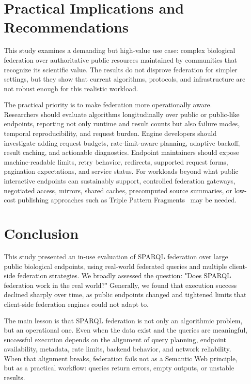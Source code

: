 \documentclass[runningheads]{llncs}
\begin{document}
\section{Practical Implications and Recommendations}\label{sec8}
This study examines a demanding but high-value use case: complex biological federation over authoritative public resources maintained by communities that recognize its scientific value. 
The results do not disprove federation for simpler settings, but they show that current algorithms, protocols, and infrastructure are not robust enough for this realistic workload.

The practical priority is to make federation more operationally aware. 
Researchers should evaluate algorithms longitudinally over public or public-like endpoints, reporting not only runtime and result counts but also failure modes, temporal reproducibility, and request burden. 
Engine developers should investigate adding request budgets, rate-limit-aware planning, adaptive backoff, result caching, and actionable diagnostics. 
Endpoint maintainers should expose machine-readable limits, retry behavior, redirects, supported request forms, pagination expectations, and service status. 
For workloads beyond what public interactive endpoints can sustainably support, controlled federation gateways, negotiated access, mirrors, shared caches, precomputed source summaries, or low-cost publishing approaches such as Triple Pattern Fragments~\cite{Verborgh2016TPF} may be needed.


\section{Conclusion}\label{sec9}
This study presented an in-use evaluation of SPARQL federation over large public biological endpoints, using real-world federated queries and multiple client-side federation strategies. 
We broadly assessed the question: "Does SPARQL federation work in the real world?"
Generally, we found that execution success declined sharply over time, as public endpoints changed and tightened limits that client-side federation engines could not adapt to.

The main lesson is that SPARQL federation is not only an algorithmic problem, but an operational one. 
Even when the data exist and the queries are meaningful, successful execution depends on the alignment of query planning, endpoint availability, metadata, rate limits, backend behavior, and network reliability. 
When that alignment breaks, federation fails not as a Semantic Web principle, but as a practical workflow: queries return errors, empty outputs, or unstable results.
\end{document}
